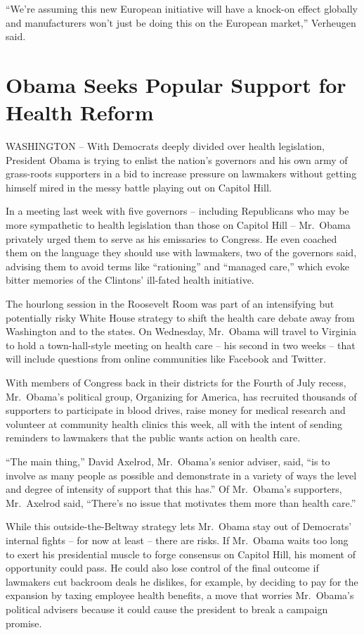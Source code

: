 ﻿\documentclass[12pt]{article}
\begin{document}
``We're assuming this new European initiative will have a knock-on effect globally and manufacturers
won't just be doing this on the European market,'' Verheugen said.

\section{Obama Seeks Popular Support for Health Reform}

WASHINGTON -- With Democrats deeply divided over health legislation, President Obama is trying to
enlist the nation's governors and his own army of grass-roots supporters in a bid to increase
pressure on lawmakers without getting himself mired in the messy battle playing out on Capitol Hill.

In a meeting last week with five governors -- including Republicans who may be more sympathetic to
health legislation than those on Capitol Hill -- Mr.~Obama privately urged them to serve as his
emissaries to Congress. He even coached them on the language they should use with lawmakers, two of
the governors said, advising them to avoid terms like ``rationing'' and ``managed care,'' which
evoke bitter memories of the Clintons' ill-fated health initiative.

The hourlong session in the Roosevelt Room was part of an intensifying but potentially risky White
House strategy to shift the health care debate away from Washington and to the states. On Wednesday,
Mr.~Obama will travel to Virginia to hold a town-hall-style meeting on health care -- his second in
two weeks -- that will include questions from online communities like Facebook and Twitter.

With members of Congress back in their districts for the Fourth of July recess, Mr.~Obama's
political group, Organizing for America, has recruited thousands of supporters to participate in
blood drives, raise money for medical research and volunteer at community health clinics this week,
all with the intent of sending reminders to lawmakers that the public wants action on health care.

``The main thing,'' David Axelrod, Mr.~Obama's senior adviser, said, ``is to involve as many people
as possible and demonstrate in a variety of ways the level and degree of intensity of support that
this has.'' Of Mr.~Obama's supporters, Mr.~Axelrod said, ``There's no issue that motivates them more
than health care.''

While this outside-the-Beltway strategy lets Mr.~Obama stay out of Democrats' internal fights -- for
now at least -- there are risks. If Mr.~Obama waits too long to exert his presidential muscle to
forge consensus on Capitol Hill, his moment of opportunity could pass. He could also lose control of
the final outcome if lawmakers cut backroom deals he dislikes, for example, by deciding to pay for
the expansion by taxing employee health benefits, a move that worries Mr.~Obama's political advisers
because it could cause the president to break a campaign promise.
\end{document}
